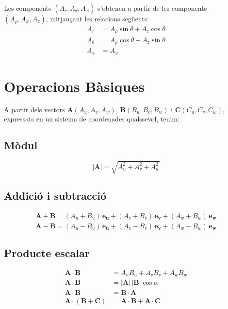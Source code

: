 \documentclass[catalan,a4paper,twoside,11pt]{article}
\begin{document}
Les components $(A_r, A_\theta, A_\varphi)$  s'obtenen a partir de les  components  $(A_\rho, A_\varphi, A_z)$, mitjançant les relacions següents:
\begin{subequations}\begin{align}
    A_r &=  A_\rho\sin\theta+A_z\cos\theta \\
    A_\theta &=  A_\rho\cos\theta-A_z\sin\theta \\
    A_\varphi &= A_\varphi 
\end{align}\end{subequations}


\section{Operacions  Bàsiques}
\newcommand{\va}{\ensuremath{\,\boldsymbol{e_u}}}
\newcommand{\vb}{\ensuremath{\,\boldsymbol{e_v}}}
\newcommand{\vc}{\ensuremath{\,\boldsymbol{e_w}}}

A partir dels vectors $\boldsymbol{A}(A_u,A_v,A_w)$,  $\boldsymbol{B}(B_u,B_v,B_w)$ i $\boldsymbol{C}(C_u,C_v,C_w)$, expressats en un sistema de coordenades qualssevol, tenim:

\subsection{Mòdul}

\begin{equation}
    |\boldsymbol{A}|=  \sqrt{A_u^2 + A_v^2 + A_w^2}
\end{equation}

\subsection{Addició i subtracció}

\begin{subequations}\begin{align}
    \boldsymbol{A+B}= (A_u+B_u)\va + (A_v+B_v)\vb + (A_w+B_w)\vc \\
    \boldsymbol{A-B}= (A_u-B_u)\va + (A_v-B_v)\vb + (A_w-B_w)\vc
\end{align}\end{subequations}

\subsection{Producte escalar}

\begin{align}
    \boldsymbol{A\cdot B} &= A_u B_u + A_v B_v + A_w B_w\\
    \boldsymbol{A\cdot B} &=|\boldsymbol{A}| \, |\boldsymbol{B}| \cos\alpha\\
    \boldsymbol{A\cdot B} &=\boldsymbol{B\cdot A}\\
    \boldsymbol{A\cdot(B+C)} &= \boldsymbol{A\cdot B+ A\cdot C}
\end{align}
\end{document}
